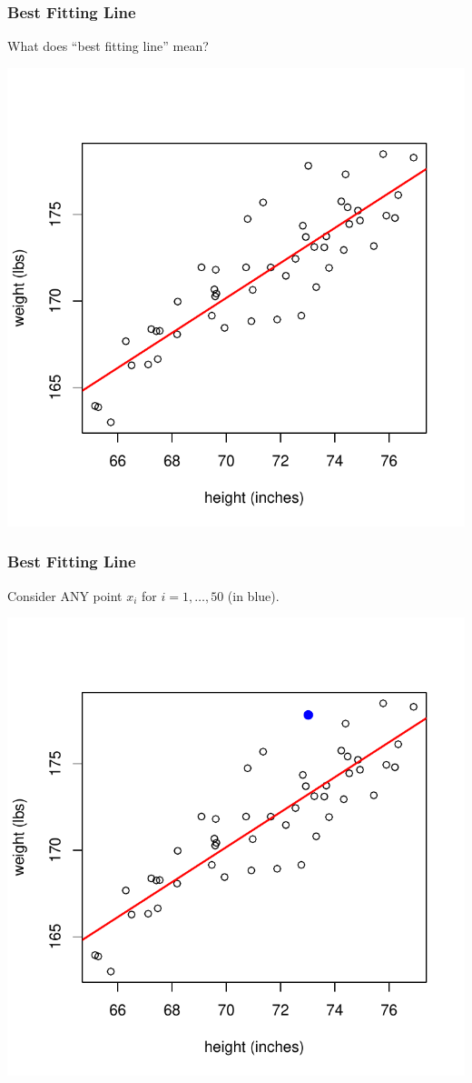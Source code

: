 \documentclass[handout]{beamer}
\begin{document}
\begin{frame}
\frametitle{Best Fitting Line}
What does ``best fitting line'' mean?
\begin{center}
\includegraphics{figure/lec24-003}
\end{center}
\end{frame}
\begin{frame}
\frametitle{Best Fitting Line}
Consider ANY point $x_i$ for $i=1,\ldots,50$ (in blue). 
\begin{center}
\includegraphics{figure/lec24-004}
\end{center}
\end{frame}
\end{document}
